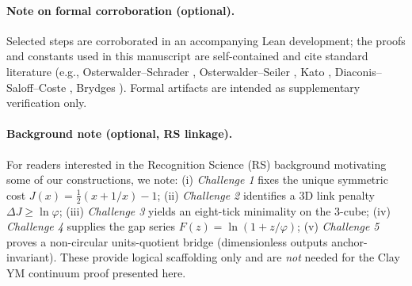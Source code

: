 \documentclass[11pt]{amsart}
\theoremstyle{plain}
\theoremstyle{definition}
\theoremstyle{remark}
\begin{document}
\paragraph{Note on formal corroboration (optional).}
Selected steps are corroborated in an accompanying Lean development; the proofs and constants used in this manuscript are self-contained and cite standard literature (e.g., Osterwalder–Schrader \cite{Osterwalder1973,Osterwalder1975}, Osterwalder–Seiler \cite{OsterwalderSeiler1978}, Kato \cite{Kato1995}, Diaconis–Saloff–Coste \cite{DiaconisSaloffCoste2004}, Brydges \cite{Brydges1978,Brydges1986}). Formal artifacts are intended as supplementary verification only.

\paragraph{Background note (optional, RS linkage).}
For readers interested in the Recognition Science (RS) background motivating some of our constructions, we note: (i) 
\emph{Challenge 1} fixes the unique symmetric cost $J(x)=\tfrac12(x+1/x)-1$; (ii) \emph{Challenge 2} identifies a $3$D link penalty $\Delta J\ge \ln\varphi$; (iii) \emph{Challenge 3} yields an eight-tick minimality on the $3$-cube; (iv) \emph{Challenge 4} supplies the gap series $F(z)=\ln(1+z/\varphi)$; (v) \emph{Challenge 5} proves a non-circular units-quotient bridge (dimensionless outputs anchor-invariant). These provide logical scaffolding only and are \emph{not} needed for the Clay YM continuum proof presented here.
\end{document}
